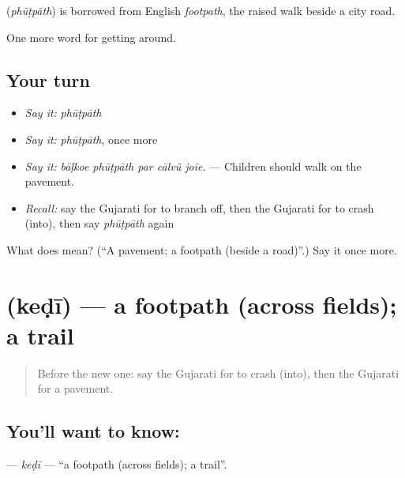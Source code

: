 \begin{cousinweb}
\textbf{} (\emph{phūṭpāth}) is borrowed from English \emph{footpath}, the raised walk beside a city road.
\end{cousinweb}

\begin{grammarlens}[title={What you've built}]
One more word for getting around.
\end{grammarlens}

\subsection*{Your turn}
\begin{itemize}
\raggedright
  \item \emph{Say it:} \emph{phūṭpāth}
  \item \emph{Say it:} \emph{phūṭpāth}, once more
  \item \emph{Say it:} \emph{bāḷkoe phūṭpāth par cālvũ joīe.} — Children should walk on the pavement.
  \item \emph{Recall:} say the Gujarati for to branch off, then the Gujarati for to crash (into), then say \emph{phūṭpāth} again
\end{itemize}

\begin{tcolorbox}[breakable,colback=teal!4,colframe=teal!35!black,title={Before you move on}]
What does  mean? (\textquotedblleft{}A pavement; a footpath (beside a road)\textquotedblright{}.) Say it once more.
\end{tcolorbox}
\section[\texorpdfstring{\gu{કેડી} (keḍī)}{કેડી (keḍī)}]{ (keḍī) — a footpath (across fields); a trail}

\label{lesson:GU-C404-kedi}



\begin{quote}
Before the new one: say the Gujarati for to crash (into), then the Gujarati for a pavement.
\end{quote}

\subsection*{You'll want to know: }
\textbf{} — \emph{keḍī} — \textquotedblleft{}a footpath (across fields); a trail\textquotedblright{}.

